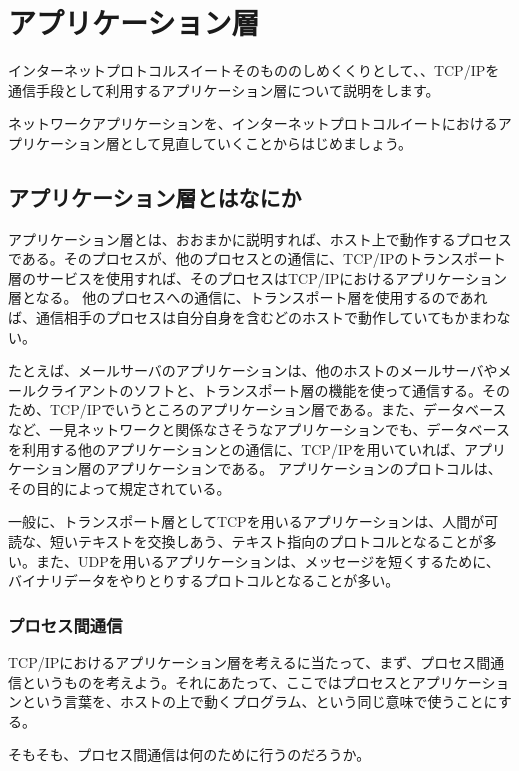 \chapter{アプリケーション層}



インターネットプロトコルスイートそのもののしめくくりとして、、TCP/IPを通信手段として利用するアプリケーション層について説明をします。

ネットワークアプリケーションを、インターネットプロトコルイートにおけるアプリケーション層として見直していくことからはじめましょう。

\section{アプリケーション層とはなにか}

アプリケーション層とは、おおまかに説明すれば、ホスト上で動作するプロセスである。そのプロセスが、他のプロセスとの通信に、TCP/IPのトランスポート層のサービスを使用すれば、そのプロセスはTCP/IPにおけるアプリケーション層となる。
他のプロセスへの通信に、トランスポート層を使用するのであれば、通信相手のプロセスは自分自身を含むどのホストで動作していてもかまわない。

たとえば、メールサーバのアプリケーションは、他のホストのメールサーバやメールクライアントのソフトと、トランスポート層の機能を使って通信する。そのため、TCP/IPでいうところのアプリケーション層である。また、データベースなど、一見ネットワークと関係なさそうなアプリケーションでも、データベースを利用する他のアプリケーションとの通信に、TCP/IPを用いていれば、アプリケーション層のアプリケーションである。
アプリケーションのプロトコルは、その目的によって規定されている。

一般に、トランスポート層としてTCPを用いるアプリケーションは、人間が可読な、短いテキストを交換しあう、テキスト指向のプロトコルとなることが多い。また、UDPを用いるアプリケーションは、メッセージを短くするために、バイナリデータをやりとりするプロトコルとなることが多い。

\subsection{プロセス間通信}
TCP/IPにおけるアプリケーション層を考えるに当たって、まず、プロセス間通信というものを考えよう。それにあたって、ここではプロセスとアプリケーションという言葉を、ホストの上で動くプログラム、という同じ意味で使うことにする。

そもそも、プロセス間通信は何のために行うのだろうか。

